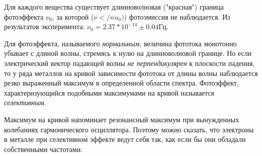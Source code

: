 Для каждого вещества существует длинноволновая ("красная") граница фотоэффекта $\nu_0$, за которой ($\nu < /nu_0)$) фотоэмиссия не наблюдается. Из результатов эксперимента: $\nu_0=2.37*10^{-14}\pm 0.04 \text{Гц}$.

Для фотоэффекта, называемого {\itshape{нормальным}}, величина фототока монотонно убывает с длиной волны, стремясь к нулю на длинноволновой границе. Но если электрический вектор падающей волны {\itshape{не перпендикулярен}} к плоскости падения, то у ряда металлов на кривой зависимости фототока от длины волны наблюдается резко выраженный максимум в определенной области спектра. Фотоэффект, характеризующийся подобными максимумами на кривой называется {\itshape{селективным}}. 

Максимум на кривой напоминает резонансный максимум при вынужденных колебаниях гармонического осциллятора. Поэтому можно сказать, что электроны в металле при селективном эффекте ведут себя так, как если бы они обладали собственными частотами.





